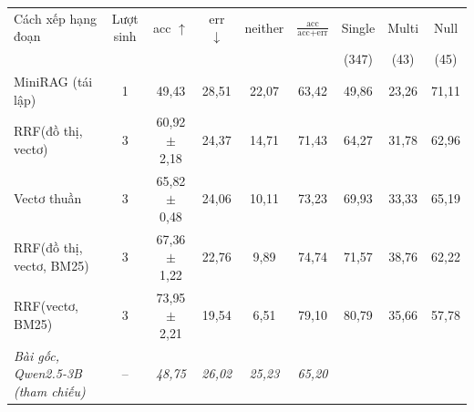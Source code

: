 \begin{tabular}{lcccccccc}
\toprule
Cách xếp hạng đoạn & Lượt sinh & acc $\uparrow$ & err $\downarrow$ & neither & $\frac{\text{acc}}{\text{acc+err}}$ & Single & Multi & Null \\
 & & & & & & (347) & (43) & (45) \\
\midrule
MiniRAG (tái lập) & 1 & 49{,}43 & 28{,}51 & 22{,}07 & 63{,}42 & 49{,}86 & 23{,}26 & 71{,}11 \\
RRF(đồ thị, vectơ) & 3 & 60{,}92 $\pm$ 2{,}18 & 24{,}37 & 14{,}71 & 71{,}43 & 64{,}27 & 31{,}78 & 62{,}96 \\
Vectơ thuần & 3 & 65{,}82 $\pm$ 0{,}48 & 24{,}06 & 10{,}11 & 73{,}23 & 69{,}93 & 33{,}33 & 65{,}19 \\
RRF(đồ thị, vectơ, BM25) & 3 & 67{,}36 $\pm$ 1{,}22 & 22{,}76 & 9{,}89 & 74{,}74 & 71{,}57 & 38{,}76 & 62{,}22 \\
RRF(vectơ, BM25) & 3 & 73{,}95 $\pm$ 2{,}21 & 19{,}54 & 6{,}51 & 79{,}10 & 80{,}79 & 35{,}66 & 57{,}78 \\
\midrule
\textit{Bài gốc, Qwen2.5-3B (tham chiếu)} & -- & \textit{48{,}75} & \textit{26{,}02} & \textit{25{,}23} & \textit{65{,}20} & & & \\
\bottomrule
\end{tabular}
